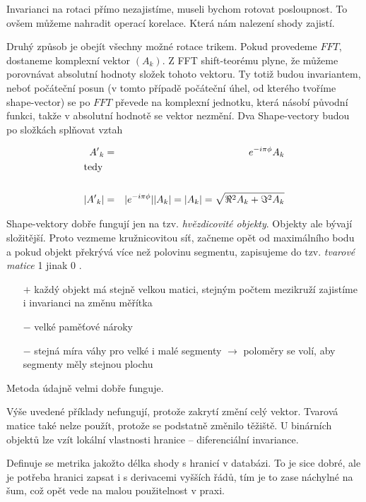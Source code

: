 Invarianci na rotaci přímo nezajistíme, museli bychom rotovat posloupnost. To ovšem můžeme nahradit operací
korelace. Která nám nalezení shody zajistí.

Druhý způsob je obejít všechny možné rotace trikem.
Pokud provedeme $FFT$, dostaneme komplexní vektor  $(A_k)$. Z FFT shift-teorému plyne, že  můžeme porovnávat 
absolutní hodnoty složek tohoto vektoru. Ty totiž budou invariantem, neboť počáteční posun (v tomto případě počáteční úhel,
od kterého tvoříme shape-vector) se po $FFT$ převede na komplexní jednotku, která násobí původní funkci, takže v absolutní
hodnotě se vektor nezmění. Dva Shape-vectory  budou po složkách splňovat vztah

\begin{eqnarray}
{A'}_k&=&e^{-i\pi\phi}A_k\\
\noalign{\hbox{tedy}\nonumber}\\
|{A'}_k|&=&|e^{-i\pi\phi}||A_k|=|A_k|=\sqrt{\Re^2A_k+\Im^2A_k}
\end{eqnarray}

Shape-vektory dobře fungují jen na tzv. {\em hvězdicovité objekty}. Objekty ale bývají složitější. Proto vezmeme
kružnicovitou síť, začneme opět od maximálního bodu a pokud objekt překrývá více než polovinu segmentu, zapisujeme
do tzv. {\em tvarové matice} 1 jinak 0 . 
\begin{itemize}
\item[$+$] každý objekt má stejně velkou matici, stejným počtem mezikruží zajistíme i invarianci na změnu měřítka
\item[$-$] velké paměťové nároky
\item[$-$] stejná míra váhy pro velké i malé segmenty $\rightarrow$ poloměry se volí, aby segmenty měly stejnou plochu
\end{itemize}
Metoda údajně velmi dobře funguje.

Výše uvedené příklady nefungují, protože zakrytí změní celý vektor. Tvarová matice také nelze použít, protože se
podstatně změnilo těžiště. U binárních objektů lze vzít lokální vlastnosti hranice -- diferenciální invariance.

Definuje se metrika jakožto délka shody s hranicí v databázi. To je sice dobré, ale je potřeba hranici zapsat i s 
derivacemi vyšších řádů, tím je to zase náchylné na šum, což opět vede na malou použitelnost v praxi.

